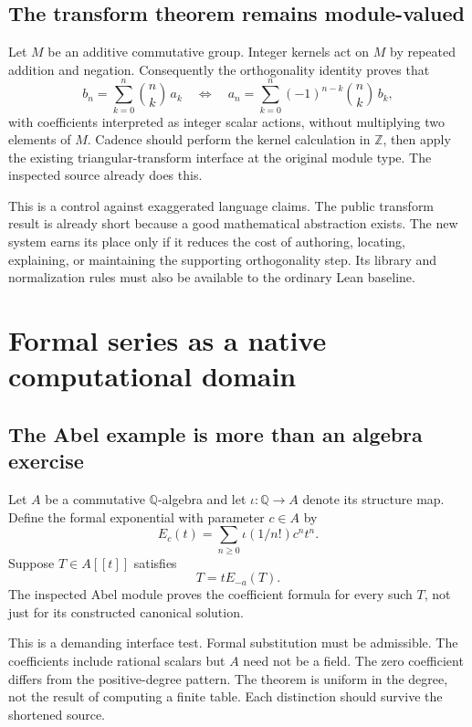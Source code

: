 \documentclass[11pt,letterpaper]{article}
\newcommand{\Z}{\mathbb Z}
\newcommand{\Q}{\mathbb Q}
\theoremstyle{definition}
\begin{document}
\subsection{The transform theorem remains module-valued}
Let \(M\) be an additive commutative group. Integer kernels act on \(M\) by repeated
addition and negation. Consequently the orthogonality identity proves that
\[
 b_n=\sum_{k=0}^{n}\binom nk\,a_k
 \quad\Longleftrightarrow\quad
 a_n=\sum_{k=0}^{n}(-1)^{n-k}\binom nk\,b_k,
\]
with coefficients interpreted as integer scalar actions, without multiplying two
elements of \(M\). Cadence should perform the kernel calculation in \(\Z\), then
apply the existing triangular-transform interface at the original module type.
The inspected source already does this\cite{pbinomial}.

This is a control against exaggerated language claims. The public transform
result is already short because a good mathematical abstraction exists. The new
system earns its place only if it reduces the cost of authoring, locating,
explaining, or maintaining the supporting orthogonality step. Its library and
normalization rules must also be available to the ordinary Lean baseline.

\section{Formal series as a native computational domain}\label{sec:series}
\subsection{The Abel example is more than an algebra exercise}
Let \(A\) be a commutative \(\Q\)-algebra and let \(\iota:\Q\to A\) denote its
structure map. Define the formal exponential with parameter \(c\in A\) by
\[
 E_c(t)=\sum_{n\ge0}\iota(1/n!)c^nt^n.
\]
Suppose \(T\in A[\![ t]\!]\) satisfies
\begin{equation}\label{eq:abel}
 T=tE_{-a}(T).
\end{equation}
The inspected Abel module proves the coefficient formula for every such \(T\),
not just for its constructed canonical solution\cite{pabel}.

This is a demanding interface test. Formal substitution must be admissible.
The coefficients include rational scalars but \(A\) need not be a field.
The zero coefficient differs from the positive-degree pattern. The theorem is
uniform in the degree, not the result of computing a finite table. Each distinction
should survive the shortened source.
\end{document}
